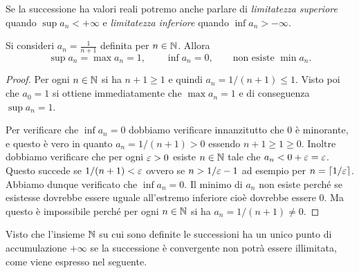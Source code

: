 Se la successione ha valori reali potremo anche parlare di 
\emph{limitatezza superiore} quando $\sup a_n <+\infty$ 
e \emph{limitatezza inferiore} quando $\inf a_n > -\infty$.


\begin{example}
Si consideri $a_n = \frac{1}{n+1}$ definita per $n\in {\mathbb N}$.
Allora
\[
  \sup a_n = \max a_n = 1, \qquad
  \inf a_n = 0, \qquad \text{non esiste }\min a_n.
\]
\end{example}
\begin{proof}
Per ogni $n \in {\mathbb N}$ si ha $n+1\ge 1$ e quindi $a_n = 1/(n+1) \le 1$.
Visto poi che $a_0 = 1$ si ottiene immediatamente che $\max a_n = 1$
e di conseguenza $\sup a_n = 1$.

Per verificare che $\inf a_n = 0$ dobbiamo verificare innanzitutto
che $0$ è minorante, e questo è vero in quanto $a_n = 1/(n+1)> 0$ essendo $n+1\ge 1 \ge 0$.
Inoltre dobbiamo verificare che per ogni $\varepsilon >0$ esiste $n\in {\mathbb N}$ tale
che $a_n < 0 + \varepsilon = \varepsilon$. Questo succede se $1/(n+1) < \varepsilon$ ovvero
se $n > 1/\varepsilon -1$ ad esempio per $n=\lceil 1/\varepsilon\rceil$.
Abbiamo dunque verificato che $\inf a_n = 0$.
Il minimo di $a_n$ non esiste perché se esistesse dovrebbe essere uguale
all'estremo inferiore cioè dovrebbe essere $0$. Ma questo è impossibile
perché per ogni $n\in {\mathbb N}$ si ha $a_n = 1/(n+1)\neq 0$.
\end{proof}

Visto che l'insieme ${\mathbb N}$ su cui sono definite le successioni 
ha un unico punto di accumulazione $+\infty$ se la successione 
è convergente non potrà essere illimitata, come viene espresso nel seguente.

